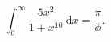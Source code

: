%

\begin{problem}[pytanie 1653979]
    \label{stack_1653979}%
    \begin{equation}
        \int_0^\infty \frac{5x^2}{1  + x^{10}} \,\mathrm{d}x = \frac{\pi}{\phi}.
    \end{equation}
\end{problem}

%